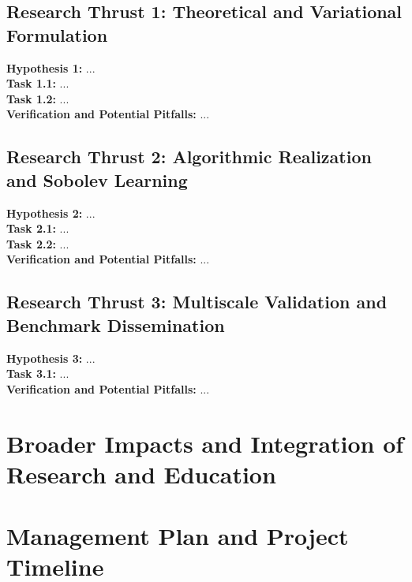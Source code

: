 \documentclass[11pt]{article}
\begin{document}
\subsection{Research Thrust 1: Theoretical and Variational Formulation}
\noindent\textbf{Hypothesis 1:} ... \\
\textbf{Task 1.1:} ... \\
\textbf{Task 1.2:} ... \\
\textbf{Verification and Potential Pitfalls:} ...

\subsection{Research Thrust 2: Algorithmic Realization and Sobolev Learning}
\noindent\textbf{Hypothesis 2:} ... \\
\textbf{Task 2.1:} ... \\
\textbf{Task 2.2:} ... \\
\textbf{Verification and Potential Pitfalls:} ...

\subsection{Research Thrust 3: Multiscale Validation and Benchmark Dissemination}
\noindent\textbf{Hypothesis 3:} ... \\
\textbf{Task 3.1:} ... \\
\textbf{Verification and Potential Pitfalls:} ...

\section{Broader Impacts and Integration of Research and Education}

\section{Management Plan and Project Timeline}
\end{document}
